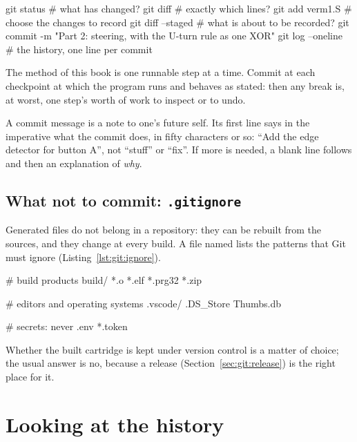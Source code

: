 \begin{shell}[caption={Inspect, stage, commit.},label=lst:git:cycle]
git status                      # what has changed?
git diff                        # exactly which lines?
git add verm1.S                 # choose the changes to record
git diff --staged               # what is about to be recorded?
git commit -m "Part 2: steering, with the U-turn rule as one XOR"
git log --oneline               # the history, one line per commit
\end{shell}

\begin{prgconcept}
The method of this book is one runnable step at a time. Commit at each
checkpoint at which the program runs and behaves as stated: then any break
is, at worst, one step's worth of work to inspect or to undo.
\end{prgconcept}

A commit message is a note to one's future self. Its first line says in the
imperative what the commit does, in fifty characters or so: ``Add the edge
detector for button A'', not ``stuff'' or ``fix''. If more is needed, a
blank line follows and then an explanation of \emph{why}.

\subsection{What not to commit: \texttt{.gitignore}}

Generated files do not belong in a repository: they can be rebuilt from the
sources, and they change at every build. A file named 
lists the patterns that Git must ignore (Listing~\ref{lst:git:ignore}).

\begin{plain}[caption={A \fname{.gitignore} for a cartridge project.},label=lst:git:ignore]
# build products
build/
*.o
*.elf
*.prg32
*.zip

# editors and operating systems
.vscode/
.DS_Store
Thumbs.db

# secrets: never
.env
*.token
\end{plain}

Whether the built cartridge is kept under version control is a matter of
choice; the usual answer is no, because a release (Section~\ref{sec:git:release})
is the right place for it.

\section{Looking at the history}

